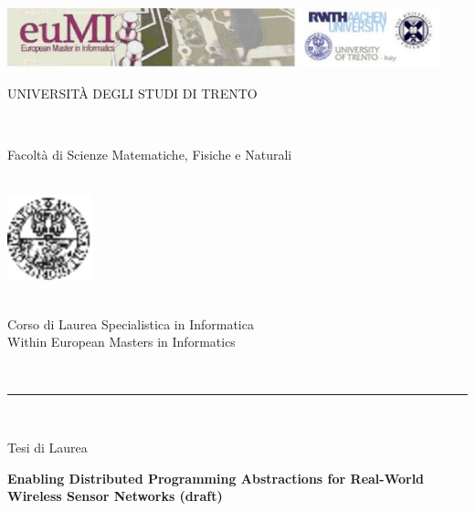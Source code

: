 \documentclass[msc, openright, a4paper]{TNthesis}
\author{Galiia Khasanova}
\begin{document}
 


\begin{preliminary}

\begin{titlepage}
	    \begin{center}
	    \vspace{-7.3cm}
	    \includegraphics[scale=.6,width=12.5cm]{img/logo_eumi.eps}\\
	 \vspace{0.3cm}
	        \begin{LARGE}
	        UNIVERSIT\`A DEGLI STUDI DI TRENTO
	        \end{LARGE}\\
	    \begin{large}
	        Facolt\`a di Scienze Matematiche, Fisiche e Naturali\\
	    \end{large}
	        \ \\
	    \vspace{0.5cm}
	    \includegraphics[width=2.5cm]{img/logo_unitn.eps}\\
	    \vspace{-0.3cm}
	    \begin{Large}
	        \ \\
	        Corso di Laurea Specialistica in Informatica\\
	        Within European Masters in Informatics
	        \end{Large}
	        \ \\
	        \hrule
	        \ \\
	        \begin{Large}
	        Tesi di Laurea\\
	        \end{Large}
	        \vspace{1.4cm}
	    \begin{center}
	    \begin{LARGE}
	        \textbf{Enabling Distributed Programming Abstractions for Real-World
Wireless Sensor Networks (draft)}\\
	        \end{LARGE}
	    \end{center}
	

\end{center}
\end{titlepage}
\end{preliminary}
\end{document}
